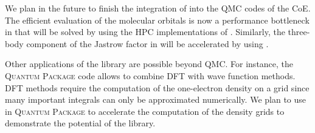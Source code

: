 \newcommand{\qp}{\textsc{Quantum Package}}

We plan in the future to finish the integration of \QMCkl{} into the \ac{QMC}
codes of the \ac{CoE}. The efficient evaluation of the molecular orbitals is
now a performance bottleneck in \turbo{} that will be solved by using the
\ac{HPC} implementations of \QMCkl{}. Similarly, the three-body component of
the Jastrow factor in \champ{} will be accelerated by using \QMCkl{}.

Other applications of the library are possible beyond \ac{QMC}. For instance, 
the \qp{} code allows to combine \ac{DFT} with wave function
methods. \ac{DFT} methods require the computation of the one-electron density on 
a grid since many important integrals can only be approximated numerically. We
plan to use \QMCkl{} in \qp{} to accelerate the computation of the density grids
to demonstrate the potential of the library.



\clearpage


